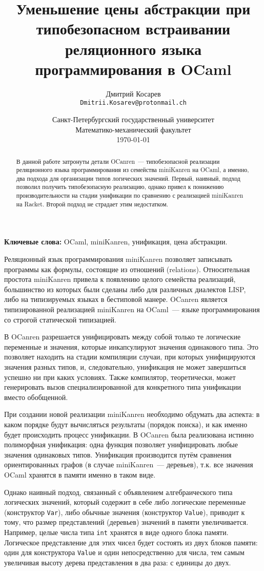 \documentclass[10pt]{article}
\title{Уменьшение цены абстракции при типобезопасном встраивании реляционного языка программирования в OCaml}
\author{
        Дмитрий Косарев\\ \texttt{Dmitrii.Kosarev@protonmail.ch}
}
\date{
  Санкт-Петербургский государственный университет\\
  Математико-механический факультет\\
  \today
}
\begin{document}
\maketitle

\begin{abstract}
В данной работе затронуты детали OCanren~--- типобезопасной реализации реляционного языка программирования
из семейства miniKanren на OCaml, а именно, два подхода для организации типов логических значений. Первый,
наивный, подход позволил получить типобезопасную реализацию, однако привел к понижению производительности
на стадии унификации по сравнению с реализацией miniKanren на Racket. Второй подход не страдает этим 
недостатком.

\end{abstract}

\textbf{Ключевые слова:} OCaml, miniKanren, унификация, цена абстракции.

\vspace{5mm}

Реляционный язык программирования miniKanren позволяет записывать программы как формулы, состоящие из отношений
(relations). Относительная простота miniKanren привела к появлению целого семейства реализаций, большинство из
которых были сделаны либо для различных диалектов LISP, либо на типизируемых языках в бестиповой манере. OCanren 
является типизированной реализацией miniKanren на OCaml~--- языке программирования со строгой статической 
типизацией.

В OCanren разрешается унифицировать между собой только те логические переменные и значения, которые инкапсулируют
значения одинакового типа. Это позволяет находить на стадии компиляции случаи, при которых унифицируются 
значения разных типов, и, следовательно, унификация не может завершиться успешно ни при каких условиях. Также
компилятор, теоретически, может генерировать вызов специализированной для конкретного типа унификации вместо 
обобщенной.

При создании новой реализации miniKanren необходимо обдумать два аспекта: в каком порядке будут вычисляться 
результаты (порядок поиска), и как именно будет происходить процесс унификации. В OCanren была реализована истинно 
полиморфная унификация: одна функция позволяет унифицировать любые значения одинаковых типов. Унификация производится
путём сравнения ориентированных графов (в случае miniKanren~--- деревьев), т.к. все значения OCaml хранятся в 
памяти именно в таком виде.

Однако наивный подход, связанный с объявлением алгебраического типа логических значений, который содержит в себе 
либо логические переменные (конструктор \verb|Var|), либо обычные значения (конструктор \verb|Value|), приводит к тому, что 
размер представлений (деревьев) значений в памяти увеличивается. 
Например, целые числа типа \verb|int| хранятся в виде одного блока памяти. Логическое представление для этих чисел
будет состоять из двух блоков памяти: один для конструктора \verb|Value| и один непосредственно для числа, тем 
самым увеличивая высоту дерева представления в два раза: с единицы до двух. 
\end{document}
